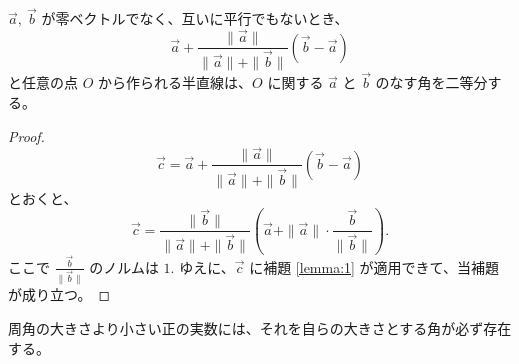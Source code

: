 \begin{lmm}\label{lemma:2}
 \(\vec{a},\ \vec{b}\) が零ベクトルでなく、互いに平行でもないとき、
 \[\vec{a}+\frac{\|\vec{a}\|}{\|\vec{a}\|+\|\vec{b}\|}(\vec{b}-\vec{a})\]
 と任意の点 \(O\) から作られる半直線は、\(O\) に関する \(\vec{a}\) と \(\vec{b}\) のなす角を二等分する。
\end{lmm}

\begin{proof}
  \[\vec{c}=\vec{a}+\frac{\|\vec{a}\|}{\|\vec{a}\|+\|\vec{b}\|}(\vec{b}-\vec{a})\]
  とおくと、
  \[\vec{c}=\frac{\|\vec{b}\|}{\|\vec{a}\|+\|\vec{b}\|}\left(\vec{a}+\|\vec{a}\|\cdot\frac{\vec{b}}{\|\vec{b}\|}\right).\]
  ここで \(\displaystyle \frac{\vec{b}}{\|\vec{b}\|}\) のノルムは \(1.\)
  ゆえに、\(\vec{c}\) に補題 \ref{lemma:1} が適用できて、当補題が成り立つ。
\end{proof}

\begin{thm}\label{theorem:36}
 周角の大きさより小さい正の実数には、それを自らの大きさとする角が必ず存在する。
\end{thm}

